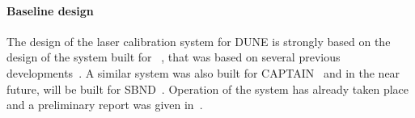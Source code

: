 
\label{sec:sp-calib-laser-req}



\label{sec:sp-calib-sys-las-ion-des}

\paragraph{Baseline design}

The design of the laser calibration system for DUNE is strongly based on the design of the system built for  ~\cite{microboone}, that was based on several previous developments~\cite{rossi2009,Zeller:2013sva,ereditato2014,Ereditato:2014tya}. A similar system was also built for CAPTAIN~\cite{captain-wp} and in the near future, will be built for SBND~\cite{sbn-prop}. Operation of the  system has already taken place and a preliminary report was given in~\cite{chen2018}.


